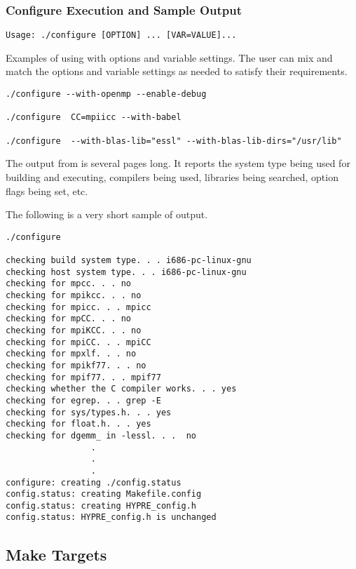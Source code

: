 \subsubsection{Configure Execution and Sample Output}
\label{Configure Execution and Sample Output}

\begin{verbatim}
Usage: ./configure [OPTION] ... [VAR=VALUE]...
\end{verbatim}

Examples of using  with options and variable settings.  The user can mix 
and match the options and variable settings as needed to satisfy their requirements.
\begin{verbatim}
./configure --with-openmp --enable-debug

./configure  CC=mpiicc --with-babel

./configure  --with-blas-lib="essl" --with-blas-lib-dirs="/usr/lib"
\end{verbatim}


The output from  is several pages long.  It reports the system type 
being used for building and executing, compilers being used, libraries being searched,
option flags being set, etc.  

The following is a very short sample of  output.
\begin{verbatim}
./configure

checking build system type. . . i686-pc-linux-gnu
checking host system type. . . i686-pc-linux-gnu
checking for mpcc. . . no
checking for mpikcc. . . no
checking for mpicc. . . mpicc
checking for mpCC. . . no
checking for mpiKCC. . . no
checking for mpiCC. . . mpiCC
checking for mpxlf. . . no
checking for mpikf77. . . no
checking for mpif77. . . mpif77
checking whether the C compiler works. . . yes
checking for egrep. . . grep -E
checking for sys/types.h. . . yes
checking for float.h. . . yes
checking for dgemm_ in -lessl. . .  no
                 .
                 .
                 .
configure: creating ./config.status
config.status: creating Makefile.config
config.status: creating HYPRE_config.h
config.status: HYPRE_config.h is unchanged

\end{verbatim}

\subsection{Make Targets}
\label{Make Targets}

